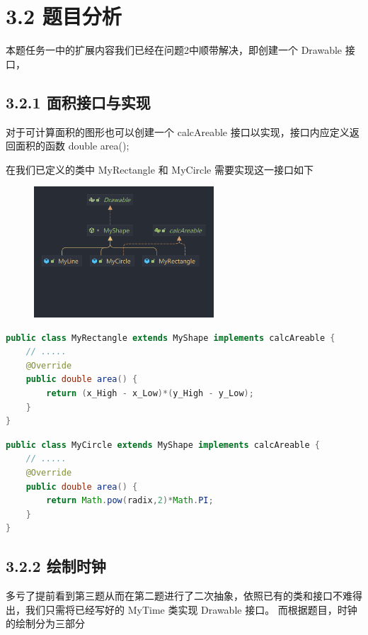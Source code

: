 \section{3.2 题目分析}

本题任务一中的扩展内容我们已经在问题2中顺带解决，即创建一个 Drawable 接口，

\subsection{3.2.1 面积接口与实现}

对于可计算面积的图形也可以创建一个 calcAreable 接口以实现，接口内应定义返回面积的函数 double area(); 

在我们已定义的类中 MyRectangle 和 MyCircle 需要实现这一接口如下

\begin{figure}[H]
    \centering
    \includegraphics[width = 0.6\textwidth]{../pic/3/3.2.png}
\end{figure}


\begin{lstlisting}[language = Java]
public class MyRectangle extends MyShape implements calcAreable {
    // .....
    @Override
    public double area() {
		return (x_High - x_Low)*(y_High - y_Low);
	}
}
\end{lstlisting}

\begin{lstlisting}[language = Java]
public class MyCircle extends MyShape implements calcAreable {
    // .....
    @Override
	public double area() {
		return Math.pow(radix,2)*Math.PI;
	}
}
\end{lstlisting}

\subsection{3.2.2 绘制时钟}
 
多亏了提前看到第三题从而在第二题进行了二次抽象，依照已有的类和接口不难得出，我们只需将已经写好的 MyTime 类实现 Drawable 接口。
而根据题目，时钟的绘制分为三部分

